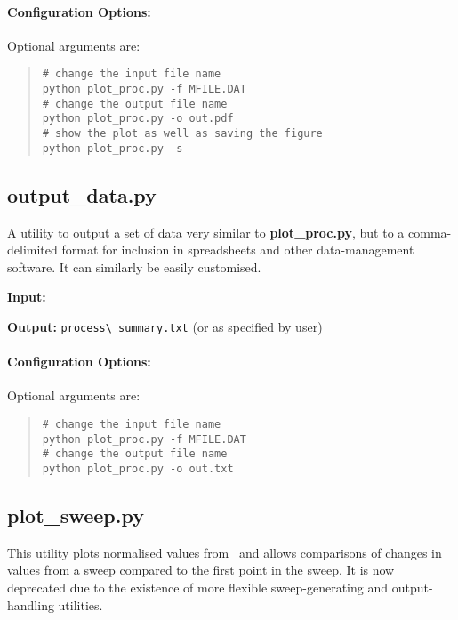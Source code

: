 \paragraph{Configuration Options:}

Optional arguments are:
\begin{quote}
\begin{verbatim}
# change the input file name
python plot_proc.py -f MFILE.DAT 
# change the output file name
python plot_proc.py -o out.pdf
# show the plot as well as saving the figure
python plot_proc.py -s 
\end{verbatim}
\end{quote}

\subsection{output\_data.py}

A utility to output a set of data very similar to {\bf plot\_proc.py}, but to a comma-delimited format for inclusion in spreadsheets and other data-management software. It can similarly be easily customised.

\begin{description}
\item{\textbf{Input:}}
 \mfile
                                
\item{\textbf{Output:}}
\verb|process\_summary.txt| (or as specified by user)
\end{description}

\paragraph{Configuration Options:}

Optional arguments are:
\begin{quote}
\begin{verbatim}
# change the input file name
python plot_proc.py -f MFILE.DAT 
# change the output file name
python plot_proc.py -o out.txt
\end{verbatim}
\end{quote}

\subsection{plot\_sweep.py}

This utility plots normalised values from \plotdat\ and allows comparisons of
changes in values from a sweep compared to the first point in the sweep. It is
now deprecated due to the existence of more flexible sweep-generating
and output-handling utilities.

